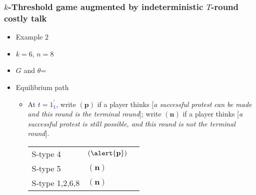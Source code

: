\documentclass[9pt]{beamer}
\begin{document}
\begin{frame}
  \frametitle{$k$-Threshold game augmented by indeterministic $T$-round costly talk}

\begin{itemize}
\item Example 2
\item $k=6$, $n=8$
\item $G$ and $\theta$=
\begin{center}
\end{center}
\end{itemize}

\begin{itemize}
\item Equilibrium path
\begin{itemize}
\item 
{
At \textcolor{blue}{$t=1^{'}_1$}, write $({\textbf{p}})$ if a player thinks \alert{[}\textit{a successful protest can be made and this round is the terminal round}\alert{]}; write $({\textbf{n}})$ if a player thinks \alert{[}\textit{a successful protest is still possible, and this round is not the terminal round}\alert{]}. 
\begin{table}[h]
\begin{tabular}{ll l}
S-type 4 & $(\alert{\textbf{p}})$\\
S-type 5 & $({\textbf{n}})$\\
S-type 1,2,6,8 & $(\textbf{n})$
\end{tabular}
\end{table}
}
\end{itemize}
\end{itemize}
\end{frame}
\end{document}
